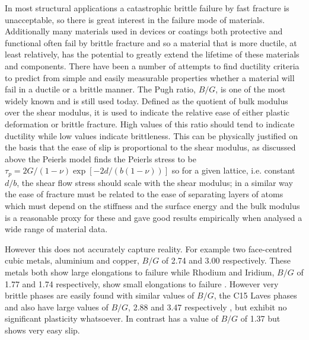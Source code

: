 

In most structural applications a catastrophic brittle failure by fast fracture is unacceptable, so there is great interest in the failure mode of materials. Additionally many materials used in devices or coatings both protective and functional often fail by brittle fracture and so a material that is more ductile, at least relatively, has the potential to greatly extend the lifetime of these materials and components.
There have been a number of attempts to find ductility criteria to predict from simple and easily measurable properties whether a material will fail in a ductile or a brittle manner.
The Pugh ratio, $B/G$, is one of the most widely known and is still used today. Defined as the quotient of bulk modulus over the shear modulus, it is used to indicate the relative ease of either plastic deformation or brittle fracture. High values of this ratio should tend to indicate ductility while low values indicate brittleness. This can be physically justified on the basis that the ease of slip is proportional to the shear modulus, as discussed above the Peierls model finds the Peierls stress to be $\tau_p = 2G / (1-\nu) \exp[-2d/(b(1-\nu))]$ so for a given lattice, i.e. constant $d/b$, the shear flow stress should scale with the shear modulus; in a similar way the ease of fracture must be related to the ease of separating layers of atoms which must depend on the stiffness and the surface energy and the bulk modulus is a reasonable proxy for these and gave good results empirically when \citet{Pugh1954} analysed a wide range of material data.

However this does not accurately capture reality. For example two face-centred cubic metals, aluminium and copper, $B/G$ of 2.74 and 3.00 respectively. These metals both show large elongations to failure while Rhodium and Iridium, $B/G$ of 1.77 and 1.74 respectively, show small elongations to failure \cite{Pugh1954}. However very brittle phases are easily found with similar values of $B/G$, the C15 Laves phases \cite{Stein2004,Stein2005}  and  also have large values of $B/G$, 2.88 and 3.47 respectively \cite{Chu1995}, but exhibit no significant plasticity whatsoever. In contrast  has a value of $B/G$ of 1.37 \cite{Barsoum2011} but shows very easy slip.






